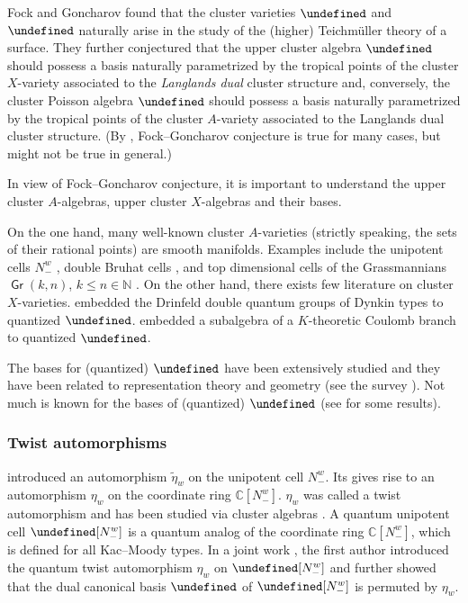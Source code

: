 \documentclass[10pt,a4paper]{amsart}
\newcommand{\N}{\mathbb{N}}
\newcommand{\C}{\mathbb{C}}
\renewcommand{\tilde}[1]{\widetilde{#1}}
\newcommand{\opname}[1]{\operatorname{\mathsf{#1}}}
\newcommand{\Gr}{\opname{Gr}}
\let\dCan\undefined
\let\upClAlg\undefined
\let\XClAlg\undefined
\let\AVar\undefined
\let\XVar\undefined
\let\qO\undefined
\newcommand{\dCan}{\opname{B}^*}
\newcommand{\upClAlg}{\mathcal{U}^A}
\newcommand{\XClAlg}{\mathcal{U}^X}
\newcommand{\AVar}{\mathbb{A}}
\newcommand{\XVar}{\mathbb{X}}
\newcommand{\qO}{{\opname{A_q}}}
\numberwithin{equation}{section}
\begin{document}
Fock and Goncharov \cite{FockGoncharov06a,FockGoncharov09} found
that the cluster varieties $\AVar$ and $\XVar$ naturally arise in
the study of the (higher) Teichm\"uller theory of a surface. They further
conjectured that the upper cluster algebra $\upClAlg$ should possess
a basis naturally parametrized by the tropical points of the cluster
$X$-variety associated to the \emph{Langlands dual }cluster structure
and, conversely, the cluster Poisson algebra $\XClAlg$ should possess
a basis naturally parametrized by the tropical points of the cluster
$A$-variety associated to the Langlands dual cluster structure. (By
\cite{gross2018canonical}, Fock--Goncharov conjecture is true for
many cases, but might not be true in general.)

In view of Fock--Goncharov conjecture, it is important to understand
the upper cluster $A$-algebras, upper cluster $X$-algebras and their
bases.

On the one hand, many well-known cluster $A$-varieties (strictly
speaking, the sets of their rational points) are smooth manifolds.
Examples include the unipotent cells $N_{-}^{w}$ \cite{GeissLeclercSchroeer10},
double Bruhat cells \cite{BerensteinFominZelevinsky05}, and top dimensional
cells of the Grassmannians $\Gr(k,n)$, $k\leq n\in\N$ \cite{scott2006grassmannians}.
On the other hand, there exists few literature on cluster $X$-varieties.
\cite{ip2018cluster,schrader2019cluster,shen2022cluster} embedded the Drinfeld
double quantum groups of Dynkin types to quantized $\XClAlg$. \cite{schrader2019k}
embedded a subalgebra of a $K$-theoretic Coulomb branch to quantized
$\XClAlg$.

The bases for (quantized) $\upClAlg$ have been extensively studied
and they have been related to representation theory and geometry (see
the survey \cite{qin2021cluster}). Not much is known for the bases
of (quantized) $\XClAlg$ (see \cite{allegretti2019categorified,FockGoncharov06a,gross2018canonical} for some results).

\subsubsection*{Twist automorphisms}

\cite{BerensteinFominZelevinsky96,berenstein1997total} introduced
an automorphism $\tilde{\eta}_{w}$ on the unipotent cell $N_{-}^{w}$.
Its gives rise to an automorphism $\eta_{w}$ on the coordinate ring
$\C[N_{-}^{w}]$. $\eta_{w}$ was called a twist automorphism and
has been studied via cluster algebras \cite{GeissLeclercSchroeer10b}.
A quantum unipotent cell $\qO[N_{-}^{w}]$ is a quantum analog of
the coordinate ring $\C[N_{-}^{w}]$, which is defined for all Kac--Moody
types. In a joint work \cite{kimura2017twist}, the first author introduced
the quantum twist automorphism $\eta_{w}$ on $\qO[N_{-}^{w}]$ and
further showed that the dual canonical basis $\dCan$ of $\qO[N_{-}^{w}]$
is permuted by $\eta_{w}$.
\end{document}
